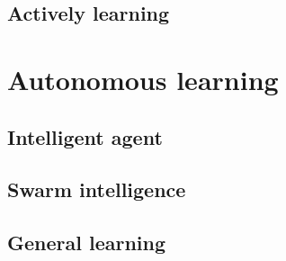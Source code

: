\subsection{}\label{subsec:rl}

\subsection{Actively learning}\label{subsec:actively-learning}



\section{Autonomous learning}\label{sec:autonomous-learning}

\subsection{Intelligent agent}\label{subsec:intelligent-agent}

\subsection{}\label{subsec:mas}

\subsection{Swarm intelligence}\label{subsec:swarm-intelligence}


\subsection{General learning}\label{subsec:general-learning}
